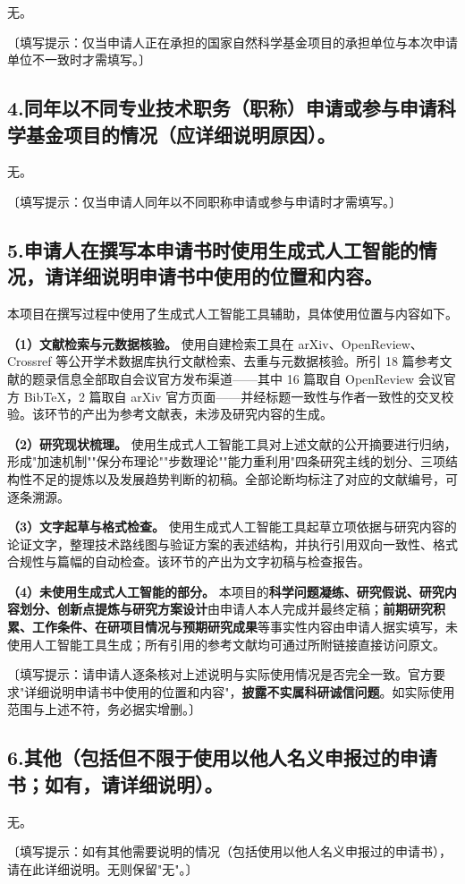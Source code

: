 \documentclass[12pt,a4paper]{ctexart}
\begin{document}
无。

〔填写提示：仅当申请人正在承担的国家自然科学基金项目的承担单位与本次申请单位不一致时才需填写。〕

\subsection*{4.同年以不同专业技术职务（职称）申请或参与申请科学基金项目的情况（应详细说明原因）。}

无。

〔填写提示：仅当申请人同年以不同职称申请或参与申请时才需填写。〕

\subsection*{5.申请人在撰写本申请书时使用生成式人工智能的情况，请详细说明申请书中使用的位置和内容。}

本项目在撰写过程中使用了生成式人工智能工具辅助，具体使用位置与内容如下。

\textbf{（1）文献检索与元数据核验。} 使用自建检索工具在 arXiv、OpenReview、Crossref 等公开学术数据库执行文献检索、去重与元数据核验。所引 18 篇参考文献的题录信息全部取自会议官方发布渠道——其中 16 篇取自 OpenReview 会议官方 BibTeX，2 篇取自 arXiv 官方页面——并经标题一致性与作者一致性的交叉校验。该环节的产出为参考文献表，未涉及研究内容的生成。

\textbf{（2）研究现状梳理。} 使用生成式人工智能工具对上述文献的公开摘要进行归纳，形成"加速机制""保分布理论""步数理论""能力重利用"四条研究主线的划分、三项结构性不足的提炼以及发展趋势判断的初稿。全部论断均标注了对应的文献编号，可逐条溯源。

\textbf{（3）文字起草与格式检查。} 使用生成式人工智能工具起草立项依据与研究内容的论证文字，整理技术路线图与验证方案的表述结构，并执行引用双向一致性、格式合规性与篇幅的自动检查。该环节的产出为文字初稿与检查报告。

\textbf{（4）未使用生成式人工智能的部分。} 本项目的\textbf{科学问题凝练、研究假说、研究内容划分、创新点提炼与研究方案设计}由申请人本人完成并最终定稿；\textbf{前期研究积累、工作条件、在研项目情况与预期研究成果}等事实性内容由申请人据实填写，未使用人工智能工具生成；所有引用的参考文献均可通过所附链接直接访问原文。

〔填写提示：请申请人逐条核对上述说明与实际使用情况是否完全一致。官方要求"详细说明申请书中使用的位置和内容"，\textbf{披露不实属科研诚信问题}。如实际使用范围与上述不符，务必据实增删。〕

\subsection*{6.其他（包括但不限于使用以他人名义申报过的申请书；如有，请详细说明）。}

无。

〔填写提示：如有其他需要说明的情况（包括使用以他人名义申报过的申请书），请在此详细说明。无则保留"无"。〕
\end{document}
